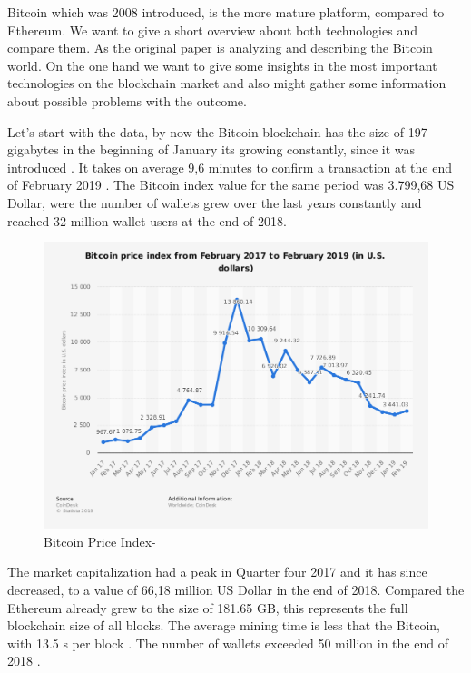 Bitcoin which was 2008 introduced, is the more mature platform, compared to Ethereum. 
We want to give a short overview about both technologies and compare them. As the original paper is analyzing and describing the Bitcoin world. 
On the one hand we want to give some insights in the most important technologies on the blockchain market and also might gather some information about possible problems with the outcome. 

Let’s start with the data, by now the Bitcoin blockchain has the size of 197 gigabytes in the beginning of January its growing constantly, since it was introduced \cite{StatBit1}.
It takes on average 9,6 minutes to confirm a transaction at the end of February 2019 \cite{StatBit1}. 
The Bitcoin index value for the same period was 3.799,68 US Dollar, were the number of wallets grew over the last years constantly and reached 32 million wallet users at the end of 2018.

\begin{figure}[h]
  \centering
  \includegraphics[width=\linewidth]{figures/marketBit.png}
  \caption{Bitcoin Price Index- \cite{statEthereum}}
  \label{fig:marketcapBitcoin}
\end{figure}


The market capitalization had a peak in Quarter four 2017 and it has since decreased, to a value of 66,18 million US Dollar in the end of 2018.
Compared the Ethereum already grew to the size of 181.65 GB, this represents the full blockchain size of all blocks. The average mining time is less that the Bitcoin, with 13.5 s per block \cite{BitInfoEther}. The number of wallets exceeded 50 million in the end of 2018 \cite{BitInfoBitcoin}.

